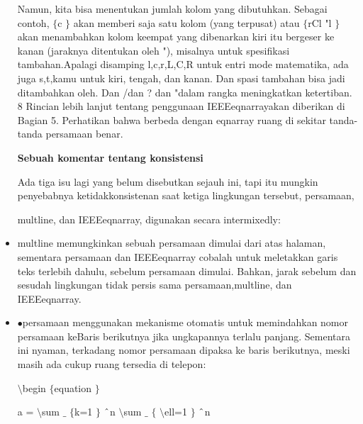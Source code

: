 \begin{itemize}
\vspace{12pt}
\vspace{16pt}
\noindent 
 \hspace*{0.5in} Namun, kita bisa menentukan jumlah kolom yang dibutuhkan. Sebagai contoh,  $  \{  $c $  \}  $ akan memberi saja satu kolom (yang terpusat) atau  $  \{  $rCl "l $  \}  $akan menambahkan kolom keempat yang dibenarkan kiri itu bergeser ke kanan (jaraknya ditentukan oleh "), misalnya untuk spesifikasi tambahan.Apalagi disamping l,c,r,L,C,R untuk entri mode matematika, ada juga s,t,kamu untuk kiri, tengah, dan kanan. Dan spasi tambahan bisa jadi ditambahkan oleh. Dan /dan ? dan "dalam rangka meningkatkan ketertiban. 8 Rincian lebih lanjut tentang penggunaan IEEEeqnarrayakan diberikan di Bagian 5. Perhatikan bahwa berbeda dengan eqnarray ruang di sekitar tanda-tanda persamaan benar. \par
\vspace{20pt}
\noindent 
{\fontsize{14pt}{14pt}\selectfont \textbf{Sebuah komentar tentang konsistensi} \\} \par
\vspace{24pt}
\noindent 
Ada tiga isu lagi yang belum disebutkan sejauh ini, tapi itu mungkin penyebabnya ketidakkonsistenan saat ketiga lingkungan tersebut, persamaan, \par
\noindent 
multline, dan IEEEeqnarray, digunakan secara intermixedly: \par
\noindent 
\item multline memungkinkan sebuah persamaan dimulai dari atas halaman, sementara persamaan dan IEEEeqnarray cobalah untuk meletakkan garis teks terlebih dahulu, sebelum persamaan dimulai. Bahkan, jarak sebelum dan sesudah lingkungan tidak persis sama persamaan,multline, dan IEEEeqnarray. \par
\noindent 
\item  $ \bullet $persamaan menggunakan mekanisme otomatis untuk memindahkan nomor persamaan keBaris berikutnya jika ungkapannya terlalu panjang. Sementara ini nyaman, terkadang nomor persamaan dipaksa ke baris berikutnya, meski masih ada cukup ruang tersedia di telepon: \par
\vspace{20pt}
\vspace{20pt}
\noindent 
 $  \setminus  $begin $  \{  $equation $  \}  $ \par
\vspace{12pt}
\noindent 
a =  $  \setminus  $sum $  \_  $ $  \{  $k=1 $  \}  $ $  \string^  $n $  \setminus  $sum $  \_  $ $  \{  $ $  \setminus  $ell=1 $  \}  $ $  \string^  $n \par

\end{itemize}

